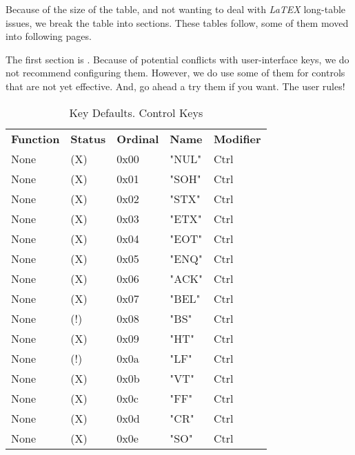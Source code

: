    Because of the size of the table, and not wanting to deal with \textsl{LaTEX}
   long-table issues, we break the table into sections.
   These tables follow, some of them moved into following pages.
   
   The first section is .
   Because of potential conflicts with user-interface keys, we do
   not recommend configuring them.
   However, we do use some of them for controls
   that are not yet effective. And, go ahead a try them if you want.
   The user rules!

   \begin{table}[htb!]
      \centering
      \caption{Key Defaults. Control Keys}
      \label{table:key_defaults_ctrl_keys}
      \begin{tabular}{l l l l l}
        \textbf{Function} & \textbf{Status} & \textbf{Ordinal} & \textbf{Name} & \textbf{Modifier} \\
        None               & (X)  &  0x00   & "NUL"        & Ctrl \\
        None               & (X)  &  0x01   & "SOH"        & Ctrl \\
        None               & (X)  &  0x02   & "STX"        & Ctrl \\
        None               & (X)  &  0x03   & "ETX"        & Ctrl \\
        None               & (X)  &  0x04   & "EOT"        & Ctrl \\
        None               & (X)  &  0x05   & "ENQ"        & Ctrl \\
        None               & (X)  &  0x06   & "ACK"        & Ctrl \\
        None               & (X)  &  0x07   & "BEL"        & Ctrl \\
        None               & (!)  &  0x08   & "BS"         & Ctrl \\
        None               & (X)  &  0x09   & "HT"         & Ctrl \\
        None               & (!)  &  0x0a   & "LF"         & Ctrl \\
        None               & (X)  &  0x0b   & "VT"         & Ctrl \\
        None               & (X)  &  0x0c   & "FF"         & Ctrl \\
        None               & (X)  &  0x0d   & "CR"         & Ctrl \\
        None               & (X)  &  0x0e   & "SO"         & Ctrl \\

\end{tabular}
\end{table}

